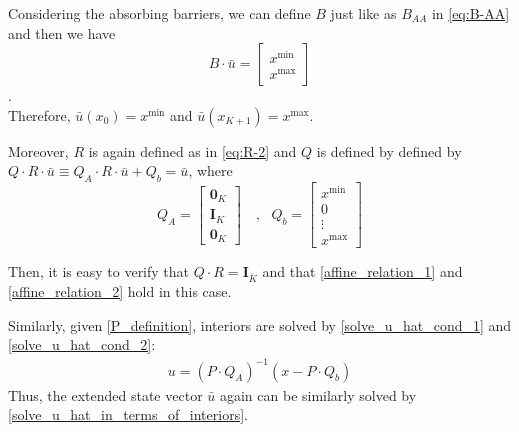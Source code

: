 \documentclass[11pt]{article}
\begin{document}
Considering the absorbing barriers, we can define $B$ just like as $B_{AA}$ in \eqref{eq:B-AA} and then we have
\begin{equation}
B\cdot\bar{u} = \begin{bmatrix}
x^{\min}\\
x^{\max}
\end{bmatrix}
\end{equation}.\\
Therefore, $\bar{u}(x_0) = x^{\min}$ and $\bar{u}(x_{K+1}) = x^{\max}$.

Moreover, $R$ is again defined as in \eqref{eq:R-2} and $Q$ is defined by defined by $Q\cdot R\cdot\bar{u}\equiv Q_A\cdot R\cdot\bar{u}+Q_b = \bar{u}$, where
\begin{equation}
Q_A = \begin{bmatrix}
\mathbf{0}_K \\
\mathbf{I}_K  \\
\mathbf{0}_K 
\end{bmatrix}%
\quad, \text{ } Q_b = \begin{bmatrix}
x^{\min}\\
0\\
\vdots\\
x^{\max}
\end{bmatrix}%
\end{equation}

Then, it is easy to verify that $Q \cdot R = \mathbf{I}_{\bar{K}}$ and that \eqref{affine_relation_1} and \eqref{affine_relation_2} hold in this case.

\iffalse
In this example, the matrix $P$ in \eqref{solve_u_hat_cond_1} becomes
\begin{align}
P = \frac{1}{\Delta}
\begin{bmatrix}
\mu^-&r\Delta-(\mu^--\mu^+)&-\mu^+&\dots&0&0&0\\
0&\mu^-&r\Delta-(\mu^--\mu^+)&\dots&0&0&0\\
\vdots&\vdots&\vdots&\ddots&\vdots&\vdots&\vdots\\
0&0&0&\dots&r\Delta-(\mu^--\mu^+)&-\mu^+&0\\
0&0&0&\cdots&\mu^-&r\Delta-(\mu^--\mu^+)&-\mu^+
\end{bmatrix}%
\end{align}
\fi
Similarly, given \eqref{P_definition}, interiors are solved by \eqref{solve_u_hat_cond_1} and \eqref{solve_u_hat_cond_2}:
\begin{align}
u = (P\cdot Q_A)^{-1}(x-P\cdot Q_b)
\end{align}
Thus, the extended state vector $\bar{u}$ again can be similarly solved by \eqref{solve_u_hat_in_terms_of_interiors}.
\end{document}
